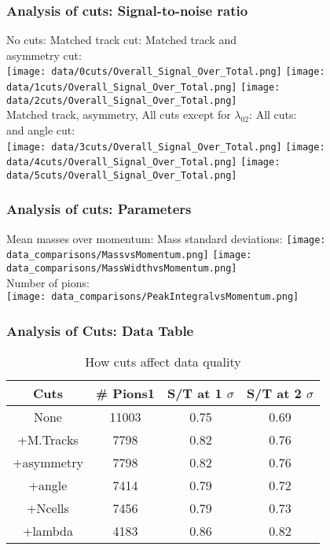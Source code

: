 \documentclass{beamer}
\begin{document}
\frame
{
\frametitle{Analysis of cuts: Signal-to-noise ratio}
No cuts:
\noindent\hspace{2.0 cm}Matched track cut:
\noindent\hspace{0.5 cm}Matched track and\\ 
\noindent\hspace{8.0 cm}asymmetry cut:\\
\texttt{[image: data/0cuts/Overall\_Signal\_Over\_Total.png]}
\texttt{[image: data/1cuts/Overall\_Signal\_Over\_Total.png]}
\texttt{[image: data/2cuts/Overall\_Signal\_Over\_Total.png]}\\
Matched track, asymmetry, 
All cuts except for $\lambda_{02}$:
\noindent\hspace{1.0 cm}All cuts:\\
and angle cut:\\
\texttt{[image: data/3cuts/Overall\_Signal\_Over\_Total.png]}
\texttt{[image: data/4cuts/Overall\_Signal\_Over\_Total.png]}
\texttt{[image: data/5cuts/Overall\_Signal\_Over\_Total.png]}
}

\frame
{
\frametitle{Analysis of cuts: Parameters}
Mean masses over momentum: 
\noindent\hspace{1.0 cm} Mass standard deviations:
\texttt{[image: data\_comparisons/MassvsMomentum.png]}
\texttt{[image: data\_comparisons/MassWidthvsMomentum.png]}\\
Number of pions:\\
\texttt{[image: data\_comparisons/PeakIntegralvsMomentum.png]}\\
}

\frame
{
\frametitle{Analysis of Cuts: Data Table}
\begin{table}
\caption{How cuts affect data quality}
\centering
\begin{tabular}{c c c c}
\hline\hline
Cuts & \# Pions1 & S/T at 1 $\sigma$ &  S/T at 2 $\sigma$ \\ [0.5ex] %
\hline
None & 11003& 0.75 & 0.69 \\
+M.Tracks & 7798 & 0.82 & 0.76 \\
+asymmetry & 7798 & 0.82 & 0.76 \\
+angle& 7414 & 0.79 & 0.72 \\
+Ncells & 7456 & 0.79 & 0.73 \\
+lambda & 4183 & 0.86 & 0.82 \\ [1ex]
\hline
\end{tabular}
\label{table:nonlin}
\end{table}
}
\end{document}
